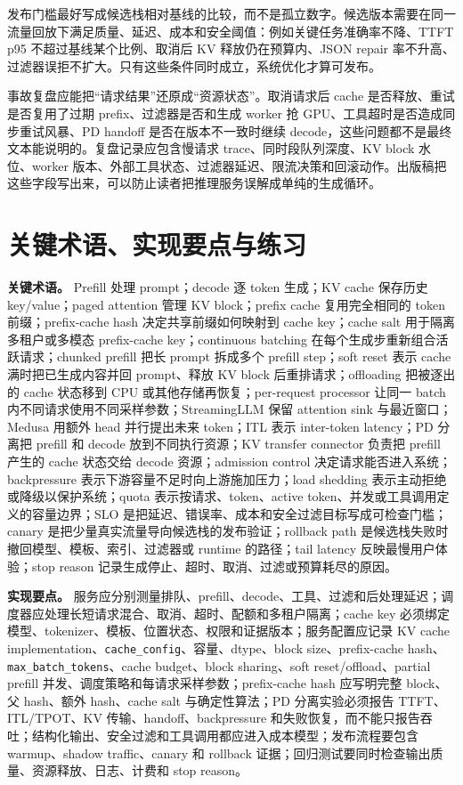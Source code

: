 \documentclass[UTF8,zihao=-4,openany]{ctexbook}
\begin{document}
发布门槛最好写成候选栈相对基线的比较，而不是孤立数字。候选版本需要在同一流量回放下满足质量、延迟、成本和安全阈值：例如关键任务准确率不降、TTFT p95 不超过基线某个比例、取消后 KV 释放仍在预算内、JSON repair 率不升高、过滤器误拒不扩大。只有这些条件同时成立，系统优化才算可发布。

事故复盘应能把“请求结果”还原成“资源状态”。取消请求后 cache 是否释放、重试是否复用了过期 prefix、过滤器是否和生成 worker 抢 GPU、工具超时是否造成同步重试风暴、PD handoff 是否在版本不一致时继续 decode，这些问题都不是最终文本能说明的。复盘记录应包含慢请求 trace、同时段队列深度、KV block 水位、worker 版本、外部工具状态、过滤器延迟、限流决策和回滚动作。出版稿把这些字段写出来，可以防止读者把推理服务误解成单纯的生成循环。

\section{关键术语、实现要点与练习}
\textbf{关键术语。} Prefill 处理 prompt；decode 逐 token 生成；KV cache 保存历史 key/value；paged attention 管理 KV block；prefix cache 复用完全相同的 token 前缀；prefix-cache hash 决定共享前缀如何映射到 cache key；cache salt 用于隔离多租户或多模态 prefix-cache key；continuous batching 在每个生成步重新组合活跃请求；chunked prefill 把长 prompt 拆成多个 prefill step；soft reset 表示 cache 满时把已生成内容并回 prompt、释放 KV block 后重排请求；offloading 把被逐出的 cache 状态移到 CPU 或其他存储再恢复；per-request processor 让同一 batch 内不同请求使用不同采样参数；StreamingLLM 保留 attention sink 与最近窗口；Medusa 用额外 head 并行提出未来 token；ITL 表示 inter-token latency；PD 分离把 prefill 和 decode 放到不同执行资源；KV transfer connector 负责把 prefill 产生的 cache 状态交给 decode 资源；admission control 决定请求能否进入系统；backpressure 表示下游容量不足时向上游施加压力；load shedding 表示主动拒绝或降级以保护系统；quota 表示按请求、token、active token、并发或工具调用定义的容量边界；SLO 是把延迟、错误率、成本和安全过滤目标写成可检查门槛；canary 是把少量真实流量导向候选栈的发布验证；rollback path 是候选栈失败时撤回模型、模板、索引、过滤器或 runtime 的路径；tail latency 反映最慢用户体验；stop reason 记录生成停止、超时、取消、过滤或预算耗尽的原因。

\textbf{实现要点。} 服务应分别测量排队、prefill、decode、工具、过滤和后处理延迟；调度器应处理长短请求混合、取消、超时、配额和多租户隔离；cache key 必须绑定模型、tokenizer、模板、位置状态、权限和证据版本；服务配置应记录 KV cache implementation、\texttt{cache\_config}、容量、dtype、block size、prefix-cache hash、\texttt{max\_batch\_tokens}、cache budget、block sharing、soft reset/offload、partial prefill 并发、调度策略和每请求采样参数；prefix-cache hash 应写明完整 block、父 hash、额外 hash、cache salt 与确定性算法；PD 分离实验必须报告 TTFT、ITL/TPOT、KV 传输、handoff、backpressure 和失败恢复，而不能只报告吞吐；结构化输出、安全过滤和工具调用都应进入成本模型；发布流程要包含 warmup、shadow traffic、canary 和 rollback 证据；回归测试要同时检查输出质量、资源释放、日志、计费和 stop reason。
\end{document}
